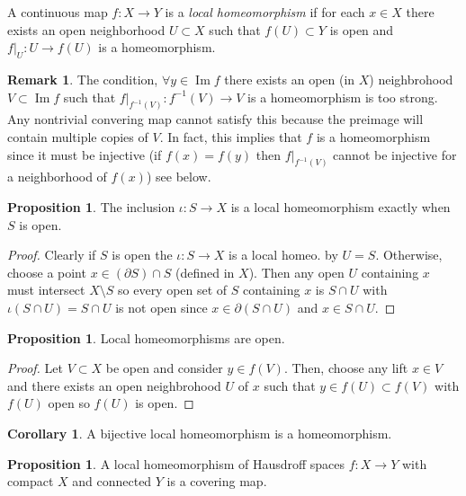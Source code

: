 \documentclass[12pt]{extarticle}
\DeclareMathOperator{\im}{\mathrm{Im}}
\theoremstyle{definition}
\newtheorem{proposition}[theorem]{Proposition}
\newtheorem{corollary}[theorem]{Corollary}
\newtheorem{remark}{Remark}
\newenvironment{definition}[1][Definition:]{\begin{trivlist}
\item[\hskip \labelsep {\bfseries #1}]}{\end{trivlist}}
\begin{document}
\begin{definition}
A continuous map $f : X \to Y$ is a \textit{local homeomorphism} if for each $x \in X$ there exists an open neighborhood $U \subset X$ such that $f(U) \subset Y$ is open and $f|_U : U \to f(U)$ is a homeomorphism.
\end{definition}

\begin{remark}
The condition, $\forall y \in \im{f}$ there exists an open (in $X$) neighbrohood $V \subset \im{f}$ such that $f |_{f^{-1}(V)} : f^{-1}(V) \to V$ is a homeomorphism is too strong. Any nontrivial convering map cannot satisfy this because the preimage will contain multiple copies of $V$. In fact, this implies that $f$ is a homeomorphism since it must be injective (if $f(x) = f(y)$ then $f|_{f^{-1}(V)}$ cannot be injective for a neighborhood of $f(x)$) see below.
\end{remark}

\begin{proposition}
The inclusion $\iota : S \to X$ is a local homeomorphism exactly when $S$ is open.
\end{proposition}

\begin{proof}
Clearly if $S$ is open the $\iota : S \to X$ is a local homeo. by $U = S$. Otherwise, choose a point $x \in (\partial S) \cap S$ (defined in $X$). Then any open $U$ containing $x$ must intersect $X \setminus S$ so every open set of $S$ containing $x$ is $S \cap U$ with $\iota(S \cap U) = S \cap U$ is not open since $x \in \partial(S \cap U)$ and $x \in S \cap U$. 
\end{proof}

\begin{proposition}
Local homeomorphisms are open.
\end{proposition}

\begin{proof}
Let $V \subset X$ be open and consider $y \in f(V)$. Then, choose any lift $x \in V$ and there exists an open neighbrohood $U$ of $x$ such that $y \in f(U) \subset f(V)$ with $f(U)$ open so $f(U)$ is open.  
\end{proof}

\begin{corollary}
A bijective local homeomorphism is a homeomorphism.
\end{corollary}

\begin{proposition}
A local homeomorphism of Hausdroff spaces $f : X \to Y$ with compact $X$ and connected $Y$ is a covering map.
\end{proposition}
\end{document}
